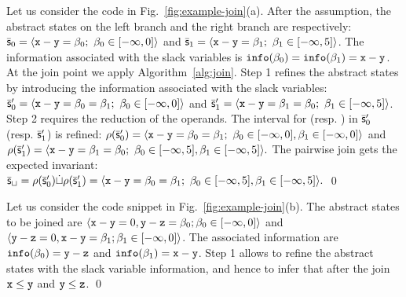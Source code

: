 \documentclass[sttt]{svjour}
\begin{document}
\begin{example}[Steps 1 \& 2]
Let us consider the code in Fig.~\ref{fig:example-join}(a).
After the assumption, the abstract states on the left branch and the right branch are respectively:
\(
\bar{\mathsf{\mathsf{s}}}_0 =  \langle \mathtt{x} -\mathtt{y} = \beta_{0};\ \beta_{0} \in [-\infty, 0] \rangle\) and %
\(
\bar{\mathsf{\mathsf{s}}}_1 = \langle \mathtt{x} -\mathtt{y} = \beta_{1};\ \beta_{1} \in [-\infty, 5] \rangle
\).
The  information associated  with the slack variables is $\mathtt{info}( \beta_{0}) = \mathtt{info}( \beta_{1}) = \mathtt{x} -\mathtt{y}$.
At the join point we apply Algorithm~\ref{alg:join}.
Step 1 refines the abstract states by introducing the information associated with the slack variables:
\(
\bar{\mathsf{\mathsf{s}}}'_0  =  \langle \mathtt{x} -\mathtt{y} =  \beta_{0} =  \beta_{1};\  \beta_{0} \in [-\infty, 0] \rangle\) and %
\(
\subpoly'_1  = \tupla{\code{x} -\code{y} =  \slackvariable{1} =  \slackvariable{0};\ \slackvariable{1} \in [-\infty, 5]}
\).
Step 2 requires the reduction of the operands. 
The interval for    (resp.  ) in $\bar{\mathsf{\mathsf{s}}}'_0$ (resp. $\bar{\mathsf{\mathsf{s}}}'_1$) is refined:
\(
\rho(\bar{\mathsf{\mathsf{s}}}'_0) =  \langle \mathtt{x} -\mathtt{y} =\beta_{0} = \beta_{1};\ \beta_{0} \in [-\infty, 0], \beta_{1} \in [-
\infty, 0] \rangle
\)
and
\(
\rho(\subpoly'_1) = \tupla{\code{x} -\code{y} = \slackvariable{1} = \slackvariable{0};\ \slackvariable{0} \in [-\infty, 5], \slackvariable{1} \in [-\infty, 5]}.
\)
The pairwise join gets the expected invariant:
\(
\bar{\mathsf{\mathsf{s}}}_\sqcup = \rho(\bar{\mathsf{\mathsf{s}}}'_0) \dot\sqcup \rho(\bar{\mathsf{\mathsf{s}}}'_1) = \langle \mathtt{x} -\mathtt{y} = \beta_{0} = \beta_{1};\ \beta_{0}\in [-\infty, 5], \beta_{1} \in [-\infty, 5] \rangle. 
\) \qed
\end{example}

\begin{example}
Let us consider the code snippet in Fig.~\ref{fig:example-join}(b).
The abstract states to be joined are 
\(
\langle \mathtt{x} -\mathtt{y} = 0, \mathtt{y} - \mathtt{z}  = \beta_{0};  \beta_{0} \in [-\infty, 0] \rangle 
\) and
\(
\langle \mathtt{y} -\mathtt{z} = 0, \mathtt{x} - \mathtt{y}  = \beta_{1};  \beta_{1} \in [-\infty, 0] \rangle
\).
The associated information are $\mathtt{info}( \beta_{0}) = \mathtt{y} -\mathtt{z}$ and $\mathtt{info}( \beta_{1}) = \mathtt{x} -\mathtt{y}$.
Step 1 allows to refine the abstract states with the slack variable information, and hence to infer that after the join $\mathtt{x} \leq \mathtt{y}$ and $\mathtt{y} \leq \mathtt{z}$. \qed
\end{example}
\end{document}
